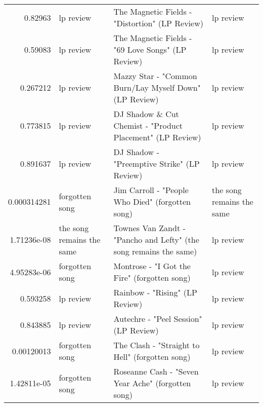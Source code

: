 \documentclass[letterpaper,10pt]{article}
\begin{document}
\begin{table}[H]
\begin{adjustbox}{max width=\linewidth}
\begin{tabular}{rlll}
  0.82963     & lp review                 & The Magnetic Fields - "Distortion" (LP Review)                                                               & lp review                 \\
  0.59083     & lp review                 & The Magnetic Fields - "69 Love Songs" (LP Review)                                                            & lp review                 \\
  0.267212    & lp review                 & Mazzy Star - "Common Burn/Lay Myself Down" (LP Review)                                                       & lp review                 \\
  0.773815    & lp review                 & DJ Shadow \& Cut Chemist - "Product Placement" (LP Review)                                                    & lp review                 \\
  0.891637    & lp review                 & DJ Shadow - "Preemptive Strike" (LP Review)                                                                  & lp review                 \\
  0.000314281 & forgotten song            & Jim Carroll - "People Who Died" (forgotten song)                                                             & the song remains the same \\
  1.71236e-08 & the song remains the same & Townes Van Zandt - "Pancho and Lefty" (the song remains the same)                                            & lp review                 \\
  4.95283e-06 & forgotten song            & Montrose - "I Got the Fire" (forgotten song)                                                                 & lp review                 \\
  0.593258    & lp review                 & Rainbow - "Rising" (LP Review)                                                                               & lp review                 \\
  0.843885    & lp review                 & Autechre - "Peel Session" (LP Review)                                                                        & lp review                 \\
  0.00120013  & forgotten song            & The Clash - "Straight to Hell" (forgotten song)                                                              & lp review                 \\
  1.42811e-05 & forgotten song            & Roseanne Cash - "Seven Year Ache" (forgotten song)                                                           & lp review                 \\

\end{tabular}
\end{adjustbox}
\end{table}
\end{document}
